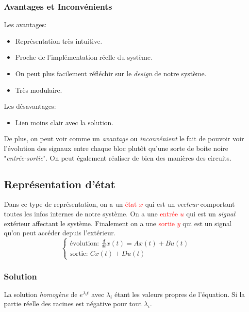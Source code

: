 \documentclass{report}
\begin{document}
\subsubsection{Avantages et Inconvénients}
Les avantages:
\begin{itemize}
	\item Représentation très intuitive.
	\item Proche de l'implémentation réelle du système.
	\item On peut plus facilement réfléchir sur le \textit{design} de notre système.
	\item Très modulaire.
\end{itemize}
Les désavantages:
\begin{itemize}
	\item Lien moins clair avec la solution.
\end{itemize}
De plus, on peut voir comme un \textit{avantage} ou \textit{inconvénient} le fait de pouvoir voir l'évolution des signaux entre chaque bloc plutôt qu'une sorte de boite noire "\textit{entrée-sortie}". On peut également réaliser de bien des manières des circuits.

\subsection{Représentation d'état}
Dans ce type de représentation, on a un \textcolor{red}{état $x$} qui est un \textit{vecteur} comportant toutes les infos internes de notre système. On a une  \textcolor{red}{entrée $u$} qui est un \textit{signal} extérieur affectant le système. Finalement on a une \textcolor{red}{sortie $y$} qui est un signal qu'on peut accéder depuis l'extérieur.\\
\begin{equation}
\begin{cases}
\text{évolution: }\frac{d}{dt}x(t) =  Ax(t) + Bu(t)\\
\text{sortie: } C x(t) + D u(t)
\end{cases}
\end{equation}

\subsubsection{Solution}
La solution \textit{homogène} de $e^{\lambda_it}$ avec $\lambda_i$ étant les valeurs propres de l'équation. Si la partie réelle des racines est négative pour tout $\lambda_i$.
\end{document}
